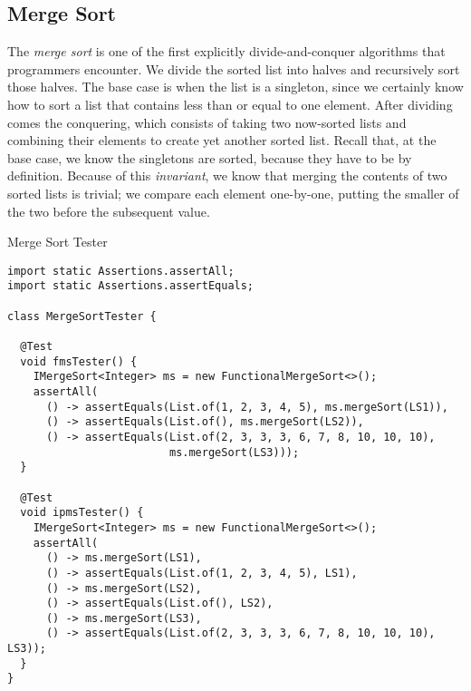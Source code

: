 \subsection{Merge Sort}

The \emph{merge sort} is one of the first explicitly divide-and-conquer algorithms that programmers encounter. We divide the sorted list into halves and recursively sort those halves. The base case is when the list is a singleton, since we certainly know how to sort a list that contains less than or equal to one element. After dividing comes the conquering, which consists of taking two now-sorted lists and combining their elements to create yet another sorted list. Recall that, at the base case, we know the singletons are sorted, because they have to be by definition. Because of this \emph{invariant}, we know that merging the contents of two sorted lists is trivial; we compare each element one-by-one, putting the smaller of the two before the subsequent value.


\begin{cl}[]{Merge Sort Tester}
\begin{lstlisting}[language=MyJava]
import static Assertions.assertAll;
import static Assertions.assertEquals;

class MergeSortTester {

  @Test
  void fmsTester() {
    IMergeSort<Integer> ms = new FunctionalMergeSort<>();
    assertAll(
      () -> assertEquals(List.of(1, 2, 3, 4, 5), ms.mergeSort(LS1)),
      () -> assertEquals(List.of(), ms.mergeSort(LS2)),
      () -> assertEquals(List.of(2, 3, 3, 3, 6, 7, 8, 10, 10, 10), 
                         ms.mergeSort(LS3)));
  }

  @Test
  void ipmsTester() {
    IMergeSort<Integer> ms = new FunctionalMergeSort<>();
    assertAll(
      () -> ms.mergeSort(LS1),
      () -> assertEquals(List.of(1, 2, 3, 4, 5), LS1),
      () -> ms.mergeSort(LS2),
      () -> assertEquals(List.of(), LS2),
      () -> ms.mergeSort(LS3),
      () -> assertEquals(List.of(2, 3, 3, 3, 6, 7, 8, 10, 10, 10), LS3));
  }
}
\end{lstlisting}
\end{cl}
  
